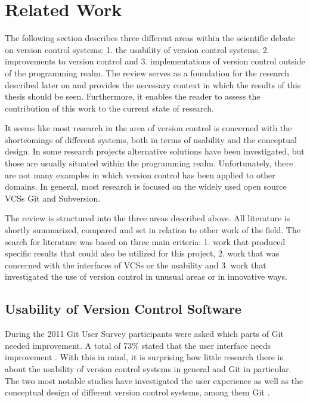 \chapter{Related Work} \label{chapter:related-work}
The following section describes three different areas within the scientific debate on version control systems: 1. the usability of version control systems, 2. improvements to version control and 3.  implementations of version control outside of the programming realm. The review serves as a foundation for the research described later on and provides the necessary context in which the results of this thesis should be seen. Furthermore, it enables the reader to assess the contribution of this work to the current state of research.

It seems like most research in the area of version control is concerned with the shortcomings of different systems, both in terms of usability and the conceptual design. In some research projects alternative solutions have been investigated, but those are usually situated within the programming realm. Unfortunately, there are not many examples in which version control has been applied to other domains. In general, most research is focused on the widely used open source VCSs Git and Subversion. 

The review is structured into the three areas described above. All literature is shortly summarized, compared and set in relation to other work of the field. The search for literature was based on three main criteria: 1. work that produced specific results that could also be utilized for this project, 2. work that was concerned with the interfaces of VCSs or the usability and 3. work that investigated the use of version control in unusual areas or in innovative ways. %

\section{Usability of Version Control Software}
During the 2011 Git User Survey participants were asked which parts of Git needed improvement. A total of 73\% stated that  the user interface needs improvement \cite{_git_2011}. With this in mind, it is surprising how little research there is about the usability of version control systems in general and Git in particular. The two most notable studies have investigated the user experience as well as the conceptual design of different version control systems, among them Git \cite{church_case_2014} \cite{perez_de_rosso_whats_2013}.

